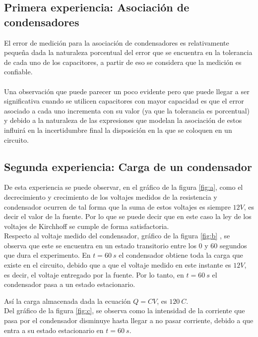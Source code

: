 \documentclass[letterpaper,11pt]{article} %
\begin{document}
\subsection{Primera experiencia: Asociación de condensadores}
El error de medición para la asociación de condensadores es relativamente pequeña dada la naturaleza porcentual del error que se encuentra en la tolerancia de cada uno de los capacitores, a partir de eso se considera que la medición es confiable.\\\\
Una observación que puede parecer un poco evidente pero que puede llegar a ser significativa cuando se utilicen capacitores con mayor capacidad es que el error asociado a cada uno incrementa con su valor (ya que la tolerancia es porcentual) y debido a la naturaleza de las expresiones que modelan la asociación de estos influirá en la incertidumbre final la disposición en la que se coloquen en un circuito.

\subsection{Segunda experiencia: Carga de un condensador}
De esta experiencia se puede observar, en el gráfico de la figura
\ref{fig:a}, como el decrecimiento y crecimiento de los voltajes medidos de la resistencia y condensador ocurren de tal forma que la suma de estos voltajes es siempre $12 V$, es decir el valor de la fuente. Por lo que se puede decir que en este caso la ley de los voltajes de Kirchhoff se cumple de forma satisfactoria.\\

Respecto al voltaje medido del condensador, gráfico de la figura \ref{fig:b} , se observa que este se encuentra en un estado transitorio entre los 0 y 60 segundos que dura el experimento. En $t=60~s$  el condensador obtiene toda la carga que existe en el circuito, debido que a que el voltaje medido en este instante es $12 V$, es decir, el voltaje entregado por la fuente. Por lo tanto, en $t=60~s$  el condensador pasa a un estado estacionario. 

Así la carga almacenada dada la ecuación $Q=CV$, es $120~C$.\\

Del gráfico de la figura \ref{fig:c}, se observa como la intensidad de la corriente que pasa por el condensador disminuye hasta llegar a no pasar corriente, debido a que entra a su estado estacionario en $t=60~s$.
\end{document}
